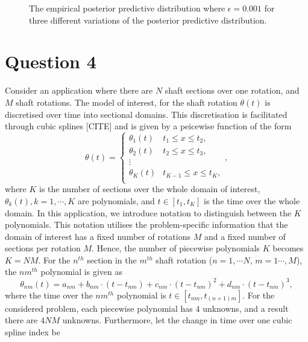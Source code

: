 \documentclass{article}
\begin{document}
\begin{figure}[htb!]
		\caption{The empirical posterior predictive distribution where $\epsilon = 0.001$ for three different variations of the posterior predictive distribution.}
		\label{fig:Q3_post_predict_samples}
	\end{figure}


	\clearpage
	
	\section{Question 4}
	
	Consider an application where there are $N$ shaft sections over one rotation, and $M$ shaft rotations. The model of interest, for the shaft rotation $\theta(t)$ is discretised over time into sectional domains. This discretisation is facilitated through cubic splines [CITE] and is given by a peicewise function of the form
	\begin{equation}
		\theta(t) = \begin{cases} 
			\theta_{1}(t) &  t_{1} \leq x \leq t_2, \\
			\theta_{2}(t) &  t_{2} \leq x \leq t_3, \\
			\vdots \\
			\theta_{K}(t) &  t_{K-1} \leq x \leq t_K, \\
		\end{cases},
	\end{equation}
	where $K$ is the number of sections over the whole domain of interest, $\theta_{k}(t), k = 1, \cdots, K$ are polynomials, and $t \in [t_1, t_K]$ is the time over the whole domain. In this application, we introduce notation to distinguish between the $K$ polynomials. This notation utilises the problem-specific information that the domain of interest has a fixed number of rotations $M$ and a fixed number of sections per rotation $M$. Hence, the number of piecewise polynomials $K$ becomes $K = NM$. For the $n^{th}$ section in the $m^{th}$ shaft rotation ($n = 1, \cdots N$, $m = 1 \cdots, M$), the $nm^{th}$ polynomial is given as
	\begin{equation}
		\theta_{nm}(t) = a_{nm} + b_{nm} \cdot \left(t - t_{nm} \right) + c_{nm} \cdot \left(t - t_{nm} \right)^2 + d_{nm} \cdot \left( t - t_{nm}\right)^3,
	\end{equation}
	where the time over the $nm^{th}$ polynomial is $t \in [t_{nm}, t_{(n + 1)m}]$. For the considered problem, each piecewise polynomial has $4$ unknowns, and a result there are $4NM$ unknowns. Furthermore, let the change in time over one cubic spline index be
\end{document}
